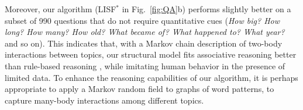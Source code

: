 \documentclass[10pt,journal,compsoc]{IEEEtran}
\begin{document}
Moreover, our algorithm  (LISF$^* $ in Fig.~\ref{fig:QA}b) performs slightly better on a subset of 990 questions that do not require quantitative cues (\textit{How big? How long? How many? How old? What became of? What happened to? What year?} and so on). This indicates that, with a Markov chain description of two-body interactions between topics,  our structural model fits associative reasoning better than rule-based reasoning \cite{Sloman1996}, while imitating human behavior in the presence of limited data. To enhance the reasoning capabilities of our algorithm, it is perhaps appropriate to apply a Markov random field \cite[\S4.1.3]{Mumford2010} to graphs of word patterns, to capture many-body interactions among different topics.




%
%

\end{document}
